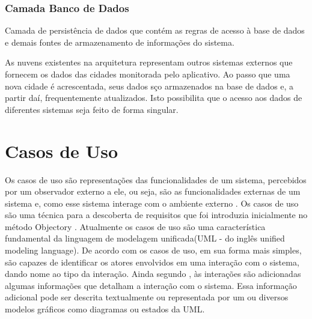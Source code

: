 \subsubsection{Camada Banco de Dados}
Camada de persist\^{e}ncia de dados que cont\'{e}m as regras de acesso \`{a} base de dados e demais fontes de armazenamento de informa\c{c}\~{o}es do sistema.\newline

As nuvens existentes na arquitetura representam outros sistemas externos que fornecem os dados das cidades monitorada pelo aplicativo. Ao passo que uma nova cidade \'{e} acrescentada, seus dados s\c{c}o armazenados na base de dados e, a partir da\'{i}, frequentemente atualizados. Isto possibilita que o acesso aos dados de diferentes sistemas seja feito de forma singular.



\section{Casos de Uso}
\label{sc:casosDeUso}

Os casos de uso são representações das funcionalidades de um sistema, percebidos por um observador externo a ele, ou seja, são as funcionalidades externas de um sistema e, como esse sistema interage com o ambiente externo \citep{bezerra07}. Os casos de uso s\~{a}o uma t\'{e}cnica para a descoberta de requisitos que foi introduzia inicialmente no m\'{e}todo Objectory \cite{jacobson93}. Atualmente os casos de uso s\~{a}o uma caracter\'{i}stica fundamental da linguagem de modelagem unificada(UML - do ingl\^{e}s unified modeling language). De acordo com \cite{SOMMERVILLE2011} os casos de uso, em sua forma mais simples, s\~{a}o capazes de identificar os atores envolvidos em uma intera\c{c}\~{a}o com o sistema, dando nome ao tipo da intera\c{c}\~{a}o. Ainda segundo \cite{SOMMERVILLE2011}, \`{a}s intera\c{c}\~{o}es s\~{a}o adicionadas algumas informa\c{c}\~{o}es que detalham a intera\c{c}\~{a}o com o sistema. Essa informa\c{c}\~{a}o adicional pode ser descrita textualmente ou representada por um ou diversos modelos gr\'{a}ficos como diagramas ou estados da UML.\newline

